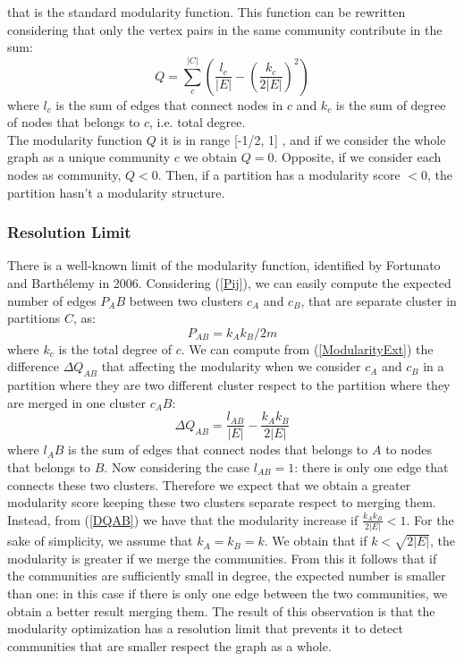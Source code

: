 that is the standard modularity function. This function can be rewritten considering that only the vertex pairs in the same community contribute in the sum: 
\begin{equation}\label{ModularityC}
Q =  \sum_{c}^{|C|} \left( \frac{l_c}{|E|} - \left( \frac{k_c}{2|E|}\right) ^2 \right)
\end{equation}
where $l_c$ is the sum of edges that connect nodes in $c$ and $k_c$ is the sum of degree of nodes that belongs to $c$, i.e. total degree. \\
The modularity function $Q$ it is in range [-1/2, 1] \cite{bounds}, and if we consider the whole graph as a unique community $c$ we obtain $Q = 0$. Opposite, if we consider each nodes as community, $Q < 0$. Then, if a partition has a modularity score $<0$, the partition hasn't a modularity structure. 
\subsubsection{Resolution Limit}
There is a well-known limit of the modularity function, identified by Fortunato and Barthélemy \cite{resolution-limit} in 2006. Considering (\ref{Pij}), we can easily compute the expected number of edges $P_AB$ between two clusters $c_A$ and $c_B$, that are separate cluster in partitions $C$, as:
\begin{equation}
P_{AB} = k_A k_B /2m 
\end{equation}
where $k_c$ is the total degree of $c$.
We can compute from (\ref{ModularityExt}) the difference $\Delta Q_{AB}$ that affecting the modularity when we consider $c_A$ and $c_B$ in a partition where they are two different cluster respect to the partition where they are merged in one cluster $c_AB$:
\begin{equation}\label{DQAB}
\Delta Q_{AB} = \frac{l_{AB}}{|E|}  - \frac{k_Ak_B}{2|E|}
\end{equation}
where $l_AB$ is the sum of edges that connect nodes that belongs to $A$ to nodes that belongs to $B$.
Now considering the case $l_{AB} = 1$: there is only one edge that connects these two clusters. Therefore we expect that we obtain a greater modularity score keeping these two clusters separate respect to merging them. Instead, from (\ref{DQAB}) we have that the modularity increase if  $\frac{k_Ak_B}{2|E|} < 1$. For the sake of simplicity, we assume that $k_A = k_B = k$. We obtain that if $k < \sqrt{2|E|}$, the modularity is greater if we merge the communities. From this it follows that if the communities are sufficiently small in degree, the expected number is smaller than one: in this case if there is only one edge between the two communities, we obtain a better result merging them. The result of this observation is that the modularity optimization has a resolution limit that prevents it to detect communities that are smaller respect the graph as a whole.
